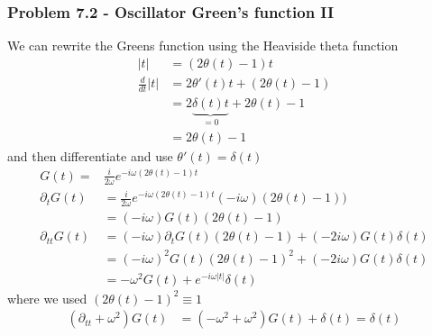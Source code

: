\documentclass[10pt,a4paper]{book}
\theoremstyle{definition}
\begin{document}
\subsubsection{Problem 7.2 - Oscillator Green's function II}
We can rewrite the Greens function using the Heaviside theta function 
\begin{align}
|t|
&=(2\theta(t)-1)t\\
\frac{d}{dt}|t|
&=2\theta'(t)t+(2\theta(t)-1)\\
&=2\underbrace{\delta(t)t}_{=0}+2\theta(t)-1\\
&=2\theta(t)-1
\end{align}
and then differentiate and use $\theta'(t)=\delta(t)$
\begin{align}
G(t)=&\frac{i}{2\omega}e^{-i\omega(2\theta(t)-1)t}\\
\partial_t G(t)
&=\frac{i}{2\omega}e^{-i\omega(2\theta(t)-1)t}(-i\omega)(2\theta(t)-1))\\
&=(-i\omega)G(t)\left(2\theta(t)-1\right)\\
\partial_{tt} G(t)
&=(-i\omega)\partial_tG(t)\left(2\theta(t)-1\right)+(-2i\omega)G(t)\delta(t)\\
&=(-i\omega)^2G(t)\left(2\theta(t)-1\right)^2+(-2i\omega)G(t)\delta(t)\\
&=-\omega^2G(t)+e^{-i\omega|t|}\delta(t)
\end{align}
where we used $\left(2\theta(t)-1\right)^2\equiv1$
\begin{align}
\left(\partial_{tt}+\omega^2\right)G(t)
&=\left(-\omega^2+\omega^2\right)G(t)+\delta(t)=\delta(t)
\end{align}
\end{document}
